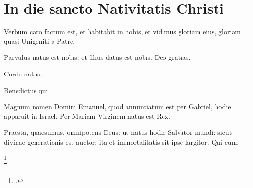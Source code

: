 \chapter{In die sancto Nativitatis Christi}

Verbum caro factum est, et habitabit in nobis,
et vidimus gloriam eius, gloriam quasi Unigeniti a Patre.

Parvulus natus est nobis: et filius datus est nobis.
Deo gratias.

Corde natus.

 Benedictus qui.

Magnum nomen Domini Emanuel, quod annuntiatum est per Gabriel,
hodie apparuit in Israel.
Per Mariam Virginem natus est Rex.\missingref{}


Praesta, quaesumus, omnipotens Deus:
ut natus hodie Salvator mundi:
sicut divinae generationis est auctor:
ita et immortalitatis sit ipse largitor.
Qui cum.

\footcite[101r]{bp1502}

